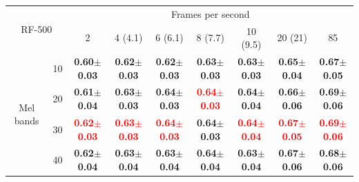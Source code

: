 \documentclass[final,3p,times,twocolumn]{elsarticle}
\begin{document}
\begin{table}[h]
\begin{tabular}{ll|c|c|c|c|c|c|c|} 
\cline{3-9}
\multicolumn{2}{c}{\multirow{2}{*}{RF-500}} & \multicolumn{7}{|c|}{Frames per second}\\ \cline{3-9}
 & & 2 & 4 (4.1) & 6 (6.1) & 8 (7.7) & 10 (9.5) & 20 (21) & 85 \\ \cline{1-9} 
\multicolumn{1}{|c}{\multirow{4}{*}{Mel bands}}
 & \multicolumn{1}{|c|}{10} & \textbf{0.60$\pm$0.03} & \textbf{0.62$\pm$0.03} & \textbf{0.62$\pm$0.03} & \textbf{0.63$\pm$0.03} & \textbf{0.63$\pm$0.03} & \textbf{0.65$\pm$0.04} & \textbf{0.67$\pm$0.05} \\ \cline{2-9}
\multicolumn{1}{|c}{}
 & \multicolumn{1}{|c|}{20} & \textbf{0.61$\pm$0.04} & \textbf{0.63$\pm$0.03} & \textbf{0.64$\pm$0.03} & \textbf{\textcolor{red}{0.64$\pm$0.03}} & \textbf{0.64$\pm$0.04} & \textbf{0.66$\pm$0.06} & \textbf{0.69$\pm$0.06} \\ \cline{2-9}
\multicolumn{1}{|c}{}
 & \multicolumn{1}{|c|}{30} & \textbf{\textcolor{red}{0.62$\pm$0.03}} & \textbf{\textcolor{red}{0.63$\pm$0.03}} & \textbf{\textcolor{red}{0.64$\pm$0.03}} & \textbf{0.64$\pm$0.03} & \textbf{\textcolor{red}{0.64$\pm$0.04}} & \textbf{\textcolor{red}{0.67$\pm$0.05}} & \textbf{\textcolor{red}{0.69$\pm$0.06}} \\ \cline{2-9}
\multicolumn{1}{|c}{}
 & \multicolumn{1}{|c|}{40} & \textbf{0.62$\pm$0.04} & \textbf{0.63$\pm$0.04} & \textbf{0.63$\pm$0.04} & \textbf{0.64$\pm$0.04} & \textbf{0.63$\pm$0.04} & \textbf{0.67$\pm$0.06} & \textbf{0.68$\pm$0.06} \\ \cline{1-9} 
\end{tabular} 


\end{table}
\end{document}
